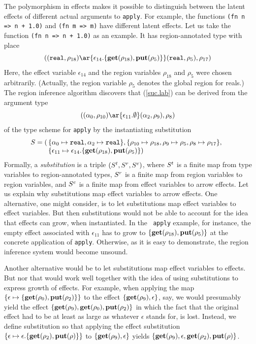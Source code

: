 \documentclass[12pt]{book}
\begin{document}
The polymorphism in effects makes it possible to distinguish between
the latent effects of different actual arguments to {\tt apply}. For
example, the functions {\tt (fn n => n + 1.0)} and {\tt (fn m => m)}
have different latent effects. Let us take the function {\tt (fn n =>
  n + 1.0)} as an example. It has region-annotated type with place
\begin{equation}
\label{suc.lab}
((\boxml{real},\rho_{18})\ar{\epsilon_{14}.\{\Get(\rho_{18}),\Put(\rho_5)\}}(\boxml{real}, \rho_5), \rho_{17})
\end{equation}
Here, the effect variable $\epsilon_{14}$ and the region variables
$\rho_{18}$ and $\rho_5$ were chosen arbitrarily. (Actually, the
region variable $\rho_5$ denotes the global region for reals.) The
region inference algorithm discovers that (\ref{suc.lab}) can be
derived from the argument type
$$((\alpha_0,\rho_{10})\ar{\epsilon_{11}.\emptyset}(\alpha_2,\rho_9),\rho_8)$$
of the type scheme for {\tt apply} by the instantiating substitution
$$S =(\!\!\begin{array}[t]{l}\{\alpha_0\mapsto\hbox{\tt real},\alpha_2\mapsto\hbox{\tt real}\},\{
       \rho_{10}\mapsto\rho_{18},\rho_9\mapsto\rho_5,\rho_8\mapsto\rho_{17}\},\\
     \{\epsilon_{11}\mapsto\epsilon_{14}.\{\mathop{\bf get}\nolimits(\rho_{18}),\mathop{\bf put}\nolimits(\rho_5)\})
   \end{array}$$
Formally, a 
%
{\em substitution\/} is a triple $(S^t,S^r,S^e)$, where $S^t$ is a
finite map from type variables to region-annotated types, $S^r$ is a
finite map from region variables to region variables, and $S^e$ is a
finite map from effect variables to arrow effects.  Let us explain why
substitutions map effect variables to arrow effects.  One alternative,
one might consider, is to let substitutions map effect variables to
effect variables. But then substitutions would not be able to account
for the idea that effects can grow, when instantiated. In the {\tt
  apply} example, for instance, the empty effect associated with
$\epsilon_{11}$ has to grow to $\{\mathop{\bf get}\nolimits(\rho_{18}),\mathop{\bf put}\nolimits(\rho_5)\}$ at
the concrete application of {\tt apply}. Otherwise, as it is easy to
demonstrate, the region inference system would become unsound.

Another alternative would be to let substitutions map effect variables
to effects. But nor that would work well together with the idea of
using substitutions to express growth of effects. For example,
when applying the map $\{\epsilon\mapsto\{\mathop{\bf get}\nolimits(\rho_0),\mathop{\bf put}\nolimits(\rho_2)\}\}$ to
the effect $\{\mathop{\bf get}\nolimits(\rho_9),\epsilon\}$, say, we would presumably yield
the effect $\{\mathop{\bf get}\nolimits(\rho_9),\mathop{\bf get}\nolimits(\rho_0),\mathop{\bf put}\nolimits(\rho_2)\}$ in which the
fact that the original effect had to be at least as large as whatever
$\epsilon$ stands for, is lost.  Instead, we define substitution so
that applying the effect substitution
$\{\epsilon\mapsto\epsilon.\{\mathop{\bf get}\nolimits(\rho_2),\mathop{\bf put}\nolimits(\rho)\}\}$ to
$\{\mathop{\bf get}\nolimits(\rho_9),\epsilon\}$ yields
$\{\mathop{\bf get}\nolimits(\rho_9),\epsilon,\mathop{\bf get}\nolimits(\rho_2),\mathop{\bf put}\nolimits(\rho)\}$.
\end{document}
